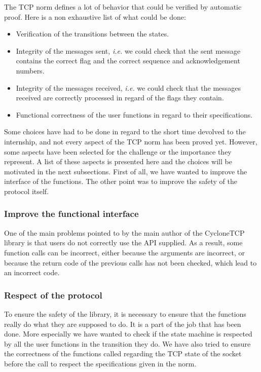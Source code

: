 \documentclass[a4paper, 10pt]{article}
\begin{document}
    The TCP norm defines a lot of behavior that could be verified by automatic proof.
    Here is a non exhaustive list of what could be done:
    \begin{itemize}
        \item Verification of the transitions between the states.
        \item Integrity of the messages sent, \textit{i.e.} we could check that the sent
        message contains the correct flag and the correct sequence and acknowledgement numbers.
        \item Integrity of the messages received, \textit{i.e.} we could check that the
        messages received are correctly processed in regard of the flags they contain.
        \item Functional correctness of the user functions in regard to their specifications.
    \end{itemize}

    Some choices have had to be done in regard to the short time devolved to the internship, and
    not every aspect of the TCP norm has been proved yet. However, some aspects have been selected
    for the challenge or the importance they represent. A list of these aspects is presented
    here and the choices will be motivated in the next subsections. First of all, we have wanted
    to improve the interface of the functions. The other point was to improve the safety of the
    protocol itself.

    \subsubsection{Improve the functional interface}

    One of the main problems pointed to by the main author of the CycloneTCP library is that users
    do not correctly use the API supplied. As a result, some function
    calls can be incorrect, either because the arguments are incorrect, or because the
    return code of the previous calls has not been checked, which lead to an
    incorrect code.

    \subsubsection{Respect of the protocol}

    To ensure the safety of the library, it is necessary to ensure that the functions really
    do what they are supposed to do. It is a part of the job that has been done. More
    especially we have wanted to check if the state machine is respected by all the
    user functions in the transition they do. We have also tried to ensure the correctness
    of the functions called regarding the TCP state of the socket before the call
    to respect the specifications given in the norm.
\end{document}
